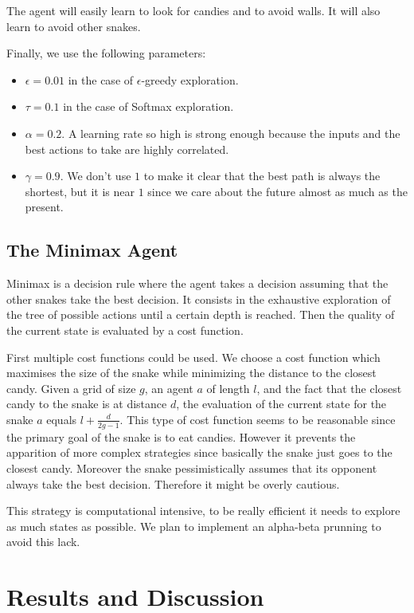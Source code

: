 \documentclass[journal, a4paper]{IEEEtran}
\begin{document}
The agent will easily learn to look for candies and to avoid walls.
It will also learn to avoid other snakes.

Finally, we use the following parameters:
\begin{itemize}
    \item $\epsilon = 0.01$ in the case of $\epsilon$-greedy exploration.
    \item $\tau = 0.1$ in the case of Softmax exploration.
    \item $\alpha = 0.2$. A learning rate so high is strong enough because the inputs and the best actions to take are highly correlated.
    \item $\gamma = 0.9$. We don't use $1$ to make it clear that the best path is always the shortest, but it is near $1$ since we care about the future almost as much as the present.
\end{itemize}

\subsection{The Minimax Agent}
Minimax is a decision rule where the agent takes a decision assuming that the other snakes take the best decision. It consists in the exhaustive exploration of the tree of possible actions until a certain depth is reached. Then the quality of the current state is evaluated by a cost function. 

First multiple cost functions could be used. We choose a cost function which maximises the size of the snake while minimizing the distance to the closest candy. Given a grid of size $g$, an agent $a$ of length $l$, and the fact that the closest candy to the snake is at distance $d$, the evaluation of the current state for the snake $a$ equals $l+\tfrac{d}{2g-1}$. This type of cost function seems to be reasonable since the primary goal of the snake is to eat candies. However it prevents the apparition of more complex strategies since basically the snake just goes to the closest candy. Moreover the snake pessimistically assumes that its opponent always take the best decision. Therefore it might be overly cautious.

This strategy is computational intensive, to be really efficient it needs to explore as much states as possible. We plan to implement an alpha-beta prunning to avoid this lack. 

\section{Results and Discussion}
\end{document}
